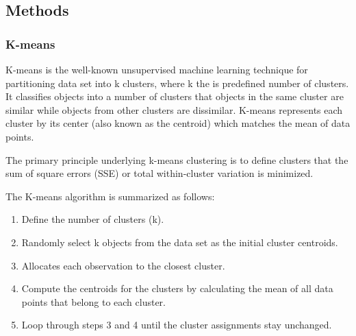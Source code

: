 \documentclass[a4paper, 12pt]{article}
\begin{document}
\subsection{Methods}


\subsubsection{K-means}

K-means \citep{lloyd1982least,macqueen1967some} is the well-known unsupervised machine learning technique for partitioning data set into k clusters, where k the is predefined number of clusters. It classifies objects into a number of clusters that objects in the same cluster are similar while objects from other clusters are dissimilar. K-means represents each cluster by its center (also known as the centroid) which matches the mean of data points.

The primary principle underlying k-means clustering is to define clusters that the sum of square errors (SSE) or total within-cluster variation is minimized. 

The K-means algorithm is summarized as follows:

\begin{enumerate}
    \item Define the number of clusters (k).
    \item Randomly select k objects from the data set as the initial cluster centroids.
    \item Allocates each observation to the closest cluster.
    \item Compute the centroids for the clusters by calculating the mean of all data points that belong to each cluster.
    \item Loop through steps 3 and 4 until the cluster assignments stay unchanged.
\end{enumerate}
\end{document}
